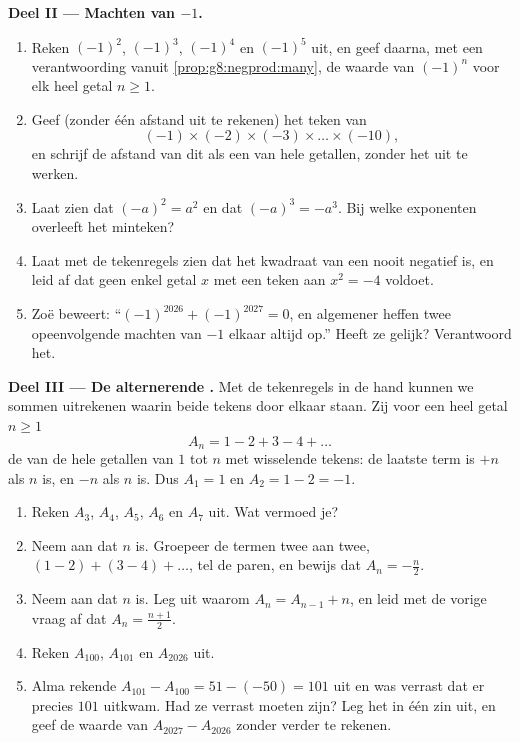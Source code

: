 \begin{problem}
\medskip
\noindent\textbf{Deel II --- Machten van $-1$.}
\begin{enumerate}[resume]
  \item Reken $(-1)^2$, $(-1)^3$, $(-1)^4$ en $(-1)^5$ uit, en geef daarna, met een
        verantwoording vanuit \cref{prop:g8:negprod:many}, de waarde van $(-1)^n$ voor
        elk heel getal $n \geq 1$.
  \item Geef (zonder één afstand uit te rekenen) het teken van
        \[
        (-1) \times (-2) \times (-3) \times \dots \times (-10),
        \]
        en schrijf de afstand van dit  als een  van hele getallen, zonder
        het uit te werken.
  \item Laat zien dat $(-a)^2 = a^2$ en dat $(-a)^3 = -a^3$. Bij welke exponenten
        overleeft het minteken?
  \item Laat met de tekenregels zien dat het kwadraat van een  nooit
        negatief is, en leid af dat geen enkel getal $x$ met een teken aan $x^2 = -4$
        voldoet.
  \item Zoë beweert: ``$(-1)^{2026} + (-1)^{2027} = 0$, en algemener heffen twee
        opeenvolgende machten van $-1$ elkaar altijd op.'' Heeft ze gelijk? Verantwoord
        het.
\end{enumerate}

\medskip
\noindent\textbf{Deel III --- De alternerende .}
Met de tekenregels in de hand kunnen we sommen uitrekenen waarin beide tekens door
elkaar staan. Zij voor een heel getal $n \geq 1$
\[
A_n = 1 - 2 + 3 - 4 + \dots
\]
de  van de hele getallen van $1$ tot $n$ met wisselende tekens: de laatste term is
$+n$ als $n$  is, en $-n$ als $n$  is. Dus $A_1 = 1$ en
$A_2 = 1 - 2 = -1$.
\begin{enumerate}[resume]
  \item Reken $A_3$, $A_4$, $A_5$, $A_6$ en $A_7$ uit. Wat vermoed je?
  \item Neem aan dat $n$  is. Groepeer de termen twee aan twee,
        $(1 - 2) + (3 - 4) + \dots$, tel de paren, en bewijs dat
        $A_n = -\frac{n}{2}$.
  \item Neem aan dat $n$  is. Leg uit waarom $A_n = A_{n-1} + n$, en leid met de
        vorige vraag af dat $A_n = \frac{n + 1}{2}$.
  \item Reken $A_{100}$, $A_{101}$ en $A_{2026}$ uit.
  \item Alma rekende $A_{101} - A_{100} = 51 - (-50) = 101$ uit en was verrast dat er
        precies $101$ uitkwam. Had ze verrast moeten zijn? Leg het in één zin uit, en
        geef de waarde van $A_{2027} - A_{2026}$ zonder verder te rekenen.
\end{enumerate}
\end{problem}
